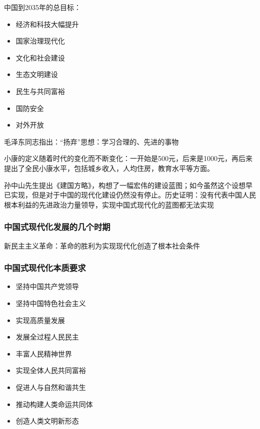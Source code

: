 中国到2035年的总目标：
\begin{itemize}
    \item 经济和科技大幅提升
    \item 国家治理现代化
    \item 文化和社会建设
    \item 生态文明建设
    \item 民生与共同富裕
    \item 国防安全
    \item 对外开放
\end{itemize}
\begin{notation}
    毛泽东同志指出：“扬弃”思想：学习合理的、先进的事物
\end{notation}
小康的定义随着时代的变化而不断变化：一开始是500元，后来是1000元，再后来提出了全民小康水平，包括城乡收入，人均住房，教育水平等方面。
\begin{notation}
    孙中山先生提出《建国方略》，构想了一幅宏伟的建设蓝图；如今虽然这个设想早已实现，但是对于中国的现代化建设仍然没有停止。历史证明：没有代表中国人民根本利益的先进政治力量领导，实现中国式现代化的蓝图都无法实现
\end{notation}
\subsubsection*{中国式现代化发展的几个时期}%
\label{subsub*:中国式现代化发展的几个时期}
新民主主义革命：革命的胜利为实现现代化创造了根本社会条件
\subsubsection*{中国式现代化本质要求}%
\label{subsub*:中国式现代化本质要求}
\begin{itemize}
    \item 坚持中国共产党领导
    \item 坚持中国特色社会主义
    \item 实现高质量发展
    \item 发展全过程人民民主
    \item 丰富人民精神世界
    \item 实现全体人民共同富裕
    \item 促进人与自然和谐共生
    \item 推动构建人类命运共同体
    \item 创造人类文明新形态
\end{itemize}
